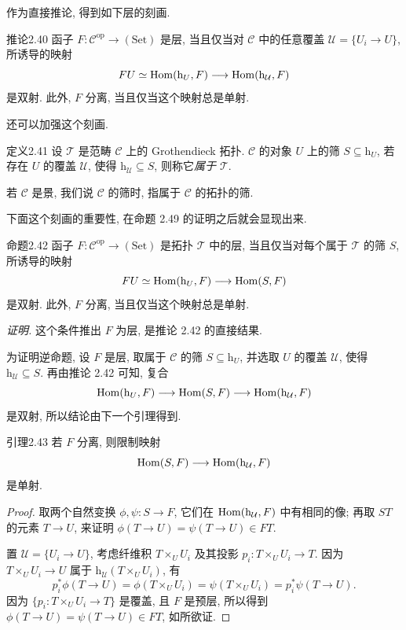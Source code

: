 作为直接推论, 得到如下层的刻画.

\begin{origstatement}{推论}{2.40}\label{ch02:cor240}
函子 $F:\mathcal C^{\mathrm{op}}\to(\mathrm{Set})$ 是层, 当且仅当对 $\mathcal C$ 中的任意覆盖 $\mathcal U=\{U_i\to U\}$, 所诱导的映射
\[
FU\simeq\operatorname{Hom}(\mathrm h_U,F)\longrightarrow\operatorname{Hom}(\mathrm h_{\mathcal U},F)
\]
是双射. 此外, $F$ 分离, 当且仅当这个映射总是单射.
\end{origstatement}

还可以加强这个刻画.

\begin{origstatement}{定义}{2.41}\label{ch02:def241}
设 $\mathcal T$ 是范畴 $\mathcal C$ 上的 Grothendieck 拓扑. $\mathcal C$ 的对象 $U$ 上的筛 $S\subseteq\mathrm h_U$, 若存在 $U$ 的覆盖 $\mathcal U$, 使得 $\mathrm h_{\mathcal U}\subseteq S$, 则称它\emph{属于 $\mathcal T$}.
\end{origstatement}

若 $\mathcal C$ 是景, 我们说 $\mathcal C$ 的筛时, 指属于 $\mathcal C$ 的拓扑的筛.

下面这个刻画的重要性, 在命题 2.49 的证明之后就会显现出来.

\begin{origstatement}{命题}{2.42}\label{ch02:prop242}
函子 $F:\mathcal C^{\mathrm{op}}\to(\mathrm{Set})$ 是拓扑 $\mathcal T$ 中的层, 当且仅当对每个属于 $\mathcal T$ 的筛 $S$, 所诱导的映射
\[
FU\simeq\operatorname{Hom}(\mathrm h_U,F)\longrightarrow\operatorname{Hom}(S,F)
\]
是双射. 此外, $F$ 分离, 当且仅当这个映射总是单射.
\end{origstatement}
\par\noindent\textit{证明.}
这个条件推出 $F$ 为层, 是推论 2.42 的直接结果.

为证明逆命题, 设 $F$ 是层, 取属于 $\mathcal C$ 的筛 $S\subseteq\mathrm h_U$, 并选取 $U$ 的覆盖 $\mathcal U$, 使得 $\mathrm h_{\mathcal U}\subseteq S$. 再由推论 2.42 可知, 复合
\[
\operatorname{Hom}(\mathrm h_U,F)\longrightarrow\operatorname{Hom}(S,F)\longrightarrow\operatorname{Hom}(\mathrm h_{\mathcal U},F)
\]
是双射, 所以结论由下一个引理得到.

\begin{origstatement}{引理}{2.43}\label{ch02:lem243}
若 $F$ 分离, 则限制映射
\[
\operatorname{Hom}(S,F)\longrightarrow\operatorname{Hom}(\mathrm h_{\mathcal U},F)
\]
是单射.
\end{origstatement}
\begin{proof}
取两个自然变换 $\phi,\psi:S\to F$, 它们在 $\operatorname{Hom}(\mathrm h_{\mathcal U},F)$ 中有相同的像; 再取 $ST$ 的元素 $T\to U$, 来证明 $\phi(T\to U)=\psi(T\to U)\in FT$.

置 $\mathcal U=\{U_i\to U\}$, 考虑纤维积 $T\times_UU_i$ 及其投影 $p_i:T\times_UU_i\to T$. 因为 $T\times_UU_i\to U$ 属于 $\mathrm h_{\mathcal U}(T\times_UU_i)$, 有
\[
p_i^*\phi(T\to U)=\phi(T\times_UU_i)=\psi(T\times_UU_i)=p_i^*\psi(T\to U).
\]
因为 $\{p_i:T\times_UU_i\to T\}$ 是覆盖, 且 $F$ 是预层, 所以得到 $\phi(T\to U)=\psi(T\to U)\in FT$, 如所欲证.
\end{proof}

